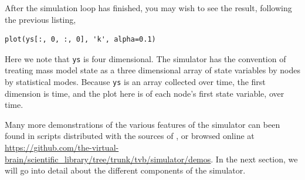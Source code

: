 After the simulation loop has finished, you may wish to see the
result, following the previous listing, 
\begin{lstlisting}
plot(ys[:, 0, :, 0], 'k', alpha=0.1)
\end{lstlisting}
\noindent Here we note that \texttt{ys} is four dimensional. The 
simulator has the convention of treating  mass model state as a
three dimensional array of state variables by nodes by statistical
modes. Because \texttt{ys} is an array collected over time, the first
dimension is time, and the plot here is of each node's first state
variable, over time.

Many more demonstrations of the various features of the simulator
can been found in scripts distributed with the sources of \TVB, or 
browsed online at \url{https://github.com/the-virtual-brain/scientific_library/tree/trunk/tvb/simulator/demos}.
In the next section, we will go into detail about the different
components of the simulator.

